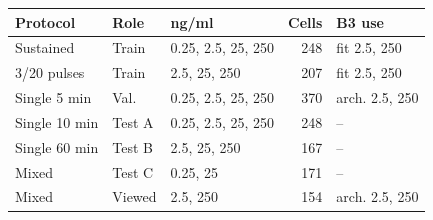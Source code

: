 \begin{tabular}{lllrl}
\toprule
Protocol & Role & ng/ml & Cells & B3 use \\
\midrule
Sustained & Train & 0.25, 2.5, 25, 250 & 248 & fit 2.5, 250 \\
3/20 pulses & Train & 2.5, 25, 250 & 207 & fit 2.5, 250 \\
Single 5 min & Val. & 0.25, 2.5, 25, 250 & 370 & arch. 2.5, 250 \\
Single 10 min & Test A & 0.25, 2.5, 25, 250 & 248 & -- \\
Single 60 min & Test B & 2.5, 25, 250 & 167 & -- \\
Mixed & Test C & 0.25, 25 & 171 & -- \\
Mixed & Viewed & 2.5, 250 & 154 & arch. 2.5, 250 \\
\bottomrule
\end{tabular}
